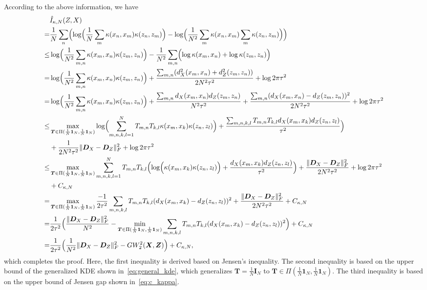 \documentclass{article}
\begin{document}
According to the above information, we have
\begin{eqnarray*}
\begin{aligned}
    &\hat{I}_{\kappa,N}(Z,X)\\
    =&\frac{1}{N}\sum_{n}\Bigl(\log\Bigl(\frac{1}{N}\sum_{m}\kappa(x_n,x_m)\kappa(z_n,z_m)\Bigr) -\log\Bigl(\frac{1}{N^2}\sum_{m}\kappa(x_n,x_m)\sum_{m}\kappa(z_n,z_m)\Bigr) \Bigr)\\
    \leq &\log\Bigl(\frac{1}{N^2}\sum_{m,n}\kappa(x_m,x_n)\kappa(z_m,z_n)\Bigr)-\frac{1}{N^2}\sum_{m,n}\Bigl(\log\kappa(x_m,x_n)+\log\kappa(z_m,z_n)\Bigr)\\
    =&\log\Bigl(\frac{1}{N^2}\sum_{m,n}\kappa(x_m,x_n)\kappa(z_m,z_n)\Bigr)+\frac{\sum_{m,n}(d_X^2(x_m,x_n)+d_Z^2(z_m,z_n))}{2N^2\tau^2}+\log2\pi\tau^2\\
    =&\log\Bigl(\frac{1}{N^2}\sum_{m,n}\kappa(x_m,x_n)\kappa(z_m,z_n)\Bigr)+\frac{\sum_{m,n}d_X(x_m,x_n)d_Z(z_m,z_n)}{N^2\tau^2}+\frac{\sum_{m,n}(d_X(x_m,x_n)-d_Z(z_m,z_n))^2}{2N^2\tau^2}+\log2\pi\tau^2\\
    \leq&\max_{\bm{T}\in\Pi(\frac{1}{N}\bm{1}_N,\frac{1}{N}\bm{1}_N)}\log\Bigl(\sum_{m,n,k,l=1}^{N}T_{m,n}T_{k,l}\kappa(x_m,x_k)\kappa(z_n,z_l)\Bigr)+\frac{\sum_{m,n,k,l}T_{m,n}T_{k,l}d_X(x_m,x_k)d_Z(z_n,z_l)}{\tau^2}\Bigr)\\
    &+\frac{1}{2N^2\tau^2}\|\bm{D}_X-\bm{D}_Z\|_F^2+\log2\pi\tau^2\\
    \leq &\max_{\bm{T}\in\Pi(\frac{1}{N}\bm{1}_N,\frac{1}{N}\bm{1}_N)}\sum_{m,n,k,l=1}^{N}T_{m,n}T_{k,l}\Bigl(\log\Bigl(\kappa(x_m,x_k)\kappa(z_n,z_l)\Bigr)+\frac{d_X(x_m,x_k)d_Z(z_n,z_l)}{\tau^2}\Bigr)+\frac{\|\bm{D}_X-\bm{D}_Z\|_F^2}{2N^2\tau^2}+\log2\pi\tau^2\\
    &+C_{\kappa,N}\\
    = & \max_{\bm{T}\in\Pi(\frac{1}{N}\bm{1}_N,\frac{1}{N}\bm{1}_N)}\frac{-1}{2\tau^2}\sum_{m,n,k,l}T_{m,n}T_{k,l}(d_X(x_m,x_k)-d_Z(z_n,z_l))^2+\frac{\|\bm{D}_X-\bm{D}_Z\|_F^2}{2N^2\tau^2}+C_{\kappa,N}\\
    =&\frac{1}{2\tau^2}\Bigl(\frac{\|\bm{D}_X-\bm{D}_Z\|_F^2}{N^2}- \min_{\bm{T}\in\Pi(\frac{1}{N}\bm{1}_N,\frac{1}{N}\bm{1}_N)}\sum_{m,n,k,l}T_{m,n}T_{k,l}(d_X(x_m,x_k)-d_Z(z_n,z_l))^2 \Bigr) + C_{\kappa,N}\\
    =&\frac{1}{2\tau^2}\Bigl(\frac{1}{N^2}\|\bm{D}_X-\bm{D}_Z\|_F^2-GW_2^2(\bm{X},\bm{Z}) \Bigr)+C_{\kappa,N},
\end{aligned}    
\end{eqnarray*}
which completes the proof.
Here, the first inequality is derived based on Jensen's inequality. 
The second inequality is based on the upper bound of the generalized KDE shown in~\eqref{eq:general_kde}, which generalizes $\bm{T}=\frac{1}{N}\bm{I}_N$ to $\bm{T}\in\Pi(\frac{1}{N}\bm{1}_N,\frac{1}{N}\bm{1}_N)$.
The third inequality is based on the upper bound of Jensen gap shown in~\eqref{eq:c_kappa}. 
\end{document}
